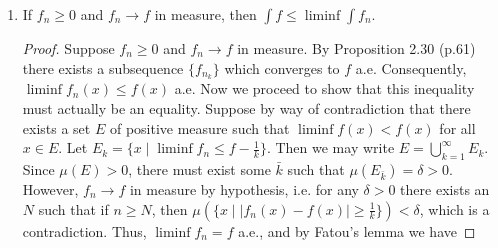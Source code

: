 \documentclass[11pt,oneside,english]{amsart}
\theoremstyle{definition}
\newcommand{\ve}{\varepsilon}
\begin{document}
\begin{enumerate}
\begin{proof}
Now we proceed to show that $f_n\rightarrow f$ in this metric iff $f_n\rightarrow f$ in measure. First, suppose that $f_n\rightarrow f$ in this metric. Then $\rho(f_n,f)\rightarrow 0$, so by definition for all $\ve>0$ there exists an $N$ such that for a.e. $x\in X$, when $n\geq N$, $\rho(f_n,f)<\ve$. Let $E_n=\{x\mid \rho(f_n(x),f(x))<\ve\}$. Then $E_n^c=\{x\mid \rho(f_n(x),f(x))\geq\ve\}$. Since $\mu(X)<\infty$, we can write $\mu(E_n^C)=\mu(X)-\mu(E_n)$ and since $\rho(f_n,f)\rightarrow 0$, we have $E_{n+1}\supset E_n$ and $X=\bigcup_{n=1}^\infty E_n$. By continuity from below, $\mu(E_n)\rightarrow \mu(X)$ snd so $\mu(E_n^c)=\mu(\{x\mid \rho(f_n(x),f(x))\geq\ve\})\rightarrow 0$, i.e. $f_n\rightarrow f$ in measure.

Next, suppose $f_n\rightarrow f$ in measure. Then $\mu(\{x\mid \rho(f_n(x),f(x))\geq \ve\})\rightarrow 0$. We can write

\[
X=\{x\mid \rho(f_n(x),f(x))\geq \ve\}\cup \{x\mid \rho(f_n(x),f(x))< \ve\}.
\]

We have

\[
\mu(X)=\mu(\{x\mid \rho(f_n(x),f(x))\geq \ve\})+ \mu(\{x\mid \rho(f_n(x),f(x))< \ve\}),
\]

and since $\mu(X)<\infty$, $\mu(\{x\mid \rho(f_n(x),f(x))\geq \ve\})\rightarrow 0$ implies that $\mu(\{x\mid \rho(f_n(x),f(x))< \ve\})\rightarrow \mu(X)$. But this implies that 

\[
X=\bigcup_{n=1}^\infty \{x\mid \rho(f_n(x),f(x))< \ve\},
\]

so for a.e. $x\in X$, $\rho(f_n(x),f(x))\rightarrow 0$, i.e. $f_n\rightarrow f$ in the metric $\rho$.
\end{proof}


\item If $f_n\geq 0$ and $f_n\rightarrow f$ in measure, then $\int f\leq \liminf \int f_n$.

\begin{proof}
Suppose $f_n\geq0$ and $f_n\rightarrow f$ in measure. By Proposition 2.30 (p.61) there exists a subsequence $\{f_{n_k}\}$ which converges to $f$ a.e. Consequently, $\liminf f_n(x)\leq f(x)$ a.e. Now we proceed to show that this inequality must actually be an equality. Suppose by way of contradiction that there exists a set $E$ of positive measure such that $\liminf f(x)<f(x)$ for all $x\in E$. Let $E_k=\{x\mid \liminf f_n \leq f-\frac{1}{k}\}$. Then we may write $E=\bigcup_{k=1}^\infty E_k$. Since $\mu(E)>0$, there must exist some $\bar{k}$ such that $\mu(E_{\bar{k}})=\delta>0$. However, $f_n\rightarrow f$ in measure by hypothesis, i.e. for any $\delta>0$ there exists an $N$ such that if $n\geq N$, then $\mu(\{x\mid |f_n(x)-f(x)|\geq\frac{1}{k}\})<\delta$, which is a contradiction. Thus, $\liminf f_n=f$ a.e., and by Fatou's lemma we have


\end{proof}
\end{enumerate}
\end{document}
